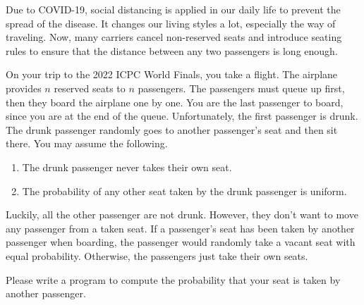 Due to COVID-19, social distancing is applied in our daily life to prevent
the spread of the disease. It changes our living styles a lot, especially 
the way of traveling. 
Now, many carriers cancel non-reserved seats and introduce seating rules 
to ensure that the distance between any two passengers is long enough.

On your trip to the 2022 ICPC World Finals, you take a flight.
The airplane provides $n$ reserved seats to $n$ passengers.
The passengers must queue up first, then they board the airplane one by one.
You are the last passenger to board, since you are at the end
of the queue.
Unfortunately, the first passenger is drunk.
The drunk passenger randomly goes to another passenger's seat 
and then sit there.
You may assume the following.
\begin{enumerate}
\item The drunk passenger never takes their own seat.
\item The probability of any other seat taken by the drunk passenger is uniform.
\end{enumerate}

Luckily, all the other passenger are not drunk. However, they don't want 
to move any passenger from a taken seat. If a passenger's seat has been taken 
by another passenger when boarding, the passenger would randomly take a 
vacant seat with equal probability. 
Otherwise, the passengers just take their own seats.

Please write a program to compute the probability that your seat is taken
by another passenger.
